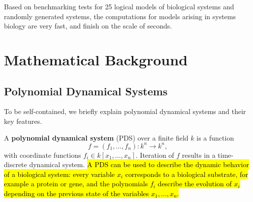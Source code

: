 \documentclass[10pt]{bmc_article}
\newenvironment{bmcformat}{\begin{raggedright}\baselineskip20pt\sloppy\setboolean{publ}{false}}{\end{raggedright}\baselineskip20pt\sloppy}
\begin{document}
\begin{bmcformat}
{%

Based on benchmarking tests for
25 logical models of biological systems \cite{GINsimRepo}
and randomly generated systems,
the computations for models arising in systems biology are very fast, and finish on the scale of
seconds.}
\appendix
\section{Mathematical Background}
\subsection{Polynomial Dynamical Systems}\label{sec:pds}
To be self-contained, we briefly explain polynomial dynamical systems and their key features.

A {\bf polynomial dynamical system} (PDS) \cite{JLSS} over a finite field $k$ is a function
$$f = (f_1, \ldots, f_n) : k^n \rightarrow k^n,$$
with coordinate functions $f_i \in k[x_1, \ldots , x_n]$. Iteration of $f$ results
in a time-discrete dynamical system. \hl{A PDS can be used to describe the dynamic behavior of a biological system: every variable $x_i$ corresponds to a biological substrate, for example a protein or gene, and the polynomials $f_i$ describe the evolution of $x_i$ depending on the previous state of the variables $x_1, \ldots, x_n$.} 



\end{bmcformat}
\end{document}
